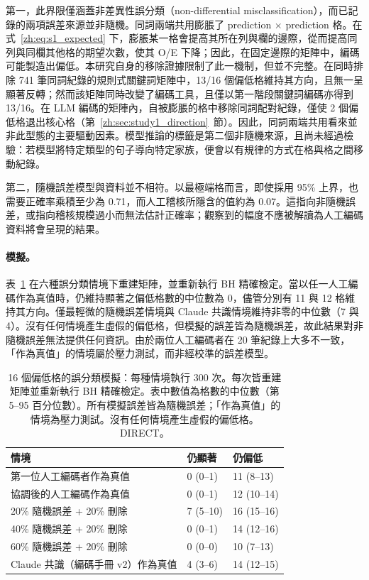 第一，此界限僅涵蓋非差異性誤分類（non-differential misclassification），而已記錄的兩項誤差來源並非隨機。同詞兩端共用膨脹了 prediction $\times$ prediction 格。在式~\eqref{zh:eq:s1_expected} 下，膨脹某一格會提高其所在列與欄的邊際，從而提高同列與同欄其他格的期望次數，使其 O/E 下降；因此，在固定邊際的矩陣中，編碼可能製造出偏低。本研究自身的移除證據限制了此一機制，但並不完整。在同時排除 741 筆同詞紀錄的規則式關鍵詞矩陣中，13/16 個偏低格維持其方向，且無一呈顯著反轉；然而該矩陣同時改變了編碼工具，且僅以第一階段關鍵詞編碼亦得到 13/16。在 LLM 編碼的矩陣內，自被膨脹的格中移除同詞配對紀錄，僅使 2 個偏低格退出核心格（第~\ref{zh:sec:study1_direction}~節）。因此，同詞兩端共用看來並非此型態的主要驅動因素。模型推論的標籤是第二個非隨機來源，且尚未經過檢驗：若模型將特定類型的句子導向特定家族，便會以有規律的方式在格與格之間移動紀錄。

第二，隨機誤差模型與資料並不相符。以最極端格而言，即使採用 95\% 上界，也需要正確率乘積至少為 0.71，而人工稽核所隱含的值約為 0.07。這指向非隨機誤差，或指向稽核規模過小而無法估計正確率；觀察到的幅度不應被解讀為人工編碼資料將會呈現的結果。

\paragraph{模擬。} 表~\ref{zh:tab:misclass} 在六種誤分類情境下重建矩陣，並重新執行 BH 精確檢定。當以任一人工編碼作為真值時，仍維持顯著之偏低格數的中位數為 0，儘管分別有 11 與 12 格維持其方向。僅最輕微的隨機誤差情境與 Claude 共識情境維持非零的中位數（7 與 4）。沒有任何情境產生虛假的偏低格，但模擬的誤差皆為隨機誤差，故此結果對非隨機誤差無法提供任何資訊。由於兩位人工編碼者在 20 筆紀錄上大多不一致，「作為真值」的情境屬於壓力測試，而非經校準的誤差模型。

\begin{table}[tbp]
  \centering
  \small
  \caption{16 個偏低格的誤分類模擬：每種情境執行 300 次。每次皆重建矩陣並重新執行 BH 精確檢定。表中數值為格數的中位數（第 5--95 百分位數）。所有模擬誤差皆為隨機誤差；「作為真值」的情境為壓力測試。沒有任何情境產生虛假的偏低格。DIRECT。}
  \label{zh:tab:misclass}
  \begin{tabular}{lll}
    \toprule
    情境 & 仍顯著 & 仍偏低 \\
    \midrule
    第一位人工編碼者作為真值 & 0 (0--1) & 11 (8--13) \\
    協調後的人工編碼作為真值 & 0 (0--1) & 12 (10--14) \\
    20\% 隨機誤差 + 20\% 刪除 & 7 (5--10) & 16 (15--16) \\
    40\% 隨機誤差 + 20\% 刪除 & 0 (0--1) & 14 (12--16) \\
    60\% 隨機誤差 + 20\% 刪除 & 0 (0--0) & 10 (7--13) \\
    Claude 共識（編碼手冊 v2）作為真值 & 4 (3--6) & 14 (12--15) \\
    \bottomrule
  \end{tabular}
\end{table}

